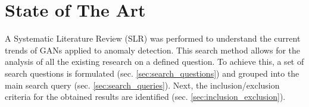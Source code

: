 \chapter{State of The Art} \label{chap:sota}



A Systematic Literature Review (SLR) was performed to understand the current trends of GANs applied to anomaly detection. This search method allows for the analysis of all the existing research on a defined question. To achieve this, a set of search questions is formulated (sec. \ref{sec:search_questions}) and grouped into the main search query (sec. \ref{sec:search_queries}). Next, the inclusion/exclusion criteria for the obtained results are identified (sec. \ref{sec:inclusion_exclusion}).

